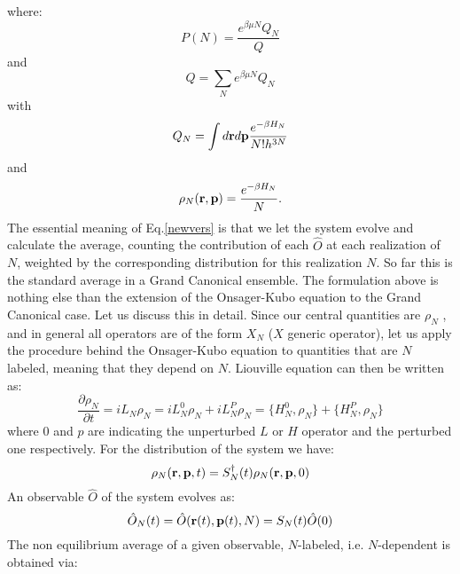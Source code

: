 \documentclass[aps,pre,preprint,unsortedaddress]{revtex4}
\newcommand{\bluec}[1]{{\color{blue} #1}}
\begin{document}
where:
\begin{equation}
P(N)=\frac{e^{\beta\mu N}Q_{N}}{Q}
\end{equation}
and
\begin{equation}
Q=\sum_{N}e^{\beta\mu N}Q_{N}
\end{equation}
with
\begin{equation}
Q_{N}=\int d{\bf r}d{\bf p} \frac{e^{-\beta H_{N}}}{N!h^{3N}}
\end{equation}
and
\begin{equation}
\rho_{N}({\bf r,p})=\frac{e^{-\beta H_{N}}}{N}.
\end{equation}
The essential meaning of Eq.\ref{newvers} is that we let the system evolve and calculate the average, counting the contribution of each $\hat{O}$ at each realization of $N$, weighted by the corresponding distribution for this realization $N$. So far this is the standard average in a Grand Canonical ensemble. The formulation above is nothing else than the extension of the Onsager-Kubo equation to the Grand Canonical case.
Let us discuss this in detail. Since our central quantities are $\rho_{N}$ , and in general all operators are of the form $X_{N}$ ($X$ generic operator), let us apply the procedure behind the Onsager-Kubo equation to quantities that are $N$ labeled, meaning that they depend on $N$. Liouville equation can then be written as:
\begin{equation}
\frac{\partial\rho_{N}}{\partial t}=i L_{N}\rho_{N}=iL_{N}^{0}\rho_{N}+iL_{N}^{P}\rho_{N}=\{H_{N}^{0},\rho_{N}\}+\{H^{P}_{N},\rho_{N}\}
\label{liouville}
\end{equation}
where $0$ and $p$ are indicating the unperturbed $L$ or $H$ operator and the perturbed one respectively.
For the distribution of the system we have:
\begin{equation}
\rho_{N}({\bf r},{\bf p},t)=S^{\dagger}_{N}(t)\rho_{N}({\bf r},{\bf p},0)
\end{equation}
An observable $\hat{O}$ of the system evolves as:
\begin{equation}
\hat{O}_{N}(t)=\hat{O}({\bf r}(t),{\bf p}(t),N)=S_{N}(t)\hat{O}(0)
\end{equation}
The non equilibrium average of a given observable, $N$-labeled, i.e. $N$-dependent is obtained via:
\end{document}
